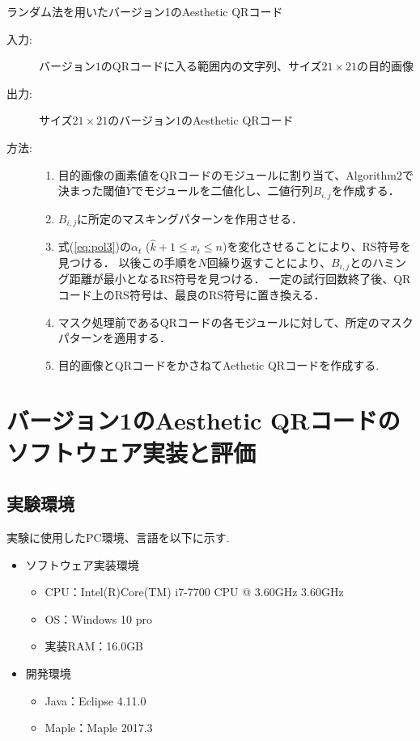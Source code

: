 \documentclass{thesis}
\begin{document}
\begin{algorithm}                      
\caption{ランダム法を用いたバージョン1のAesthetic QRコード}         
\label{alg:alg3} 
\begin{description}
\item[入力:] バージョン$1$のQRコードに入る範囲内の文字列、サイズ$21 \times 21$の目的画像
\item[出力:] サイズ$21 \times 21$のバージョン$1$のAesthetic QRコード
\item[方法:]
\begin{enumerate}
\item
目的画像の画素値をQRコードのモジュールに割り当て、Algorithm2で決まった閾値$\overline{Y}$でモジュールを二値化し、二値行列$B_{i,j}$を作成する．
\item
$B_{i,j}$に所定のマスキングパターンを作用させる．
\item
式(\ref{eq:pol3})の$\alpha_{t}$ ($\hat{k} + 1 \leq x_t \leq n $)を変化させることにより、RS符号を見つける．
以後この手順を$N$回繰り返すことにより、$B_{i,j}$とのハミング距離が最小となるRS符号を見つける．
一定の試行回数終了後、QRコード上のRS符号は、最良のRS符号に置き換える．
\item
マスク処理前であるQRコードの各モジュールに対して、所定のマスクパターンを適用する．
\item
目的画像とQRコードをかさねてAethetic QRコードを作成する.
\end{enumerate}
\end{description}
\end{algorithm} 



\chapter{バージョン1のAesthetic QRコードのソフトウェア実装と評価}
\label{chap:4}

\section{実験環境}

実験に使用したPC環境、言語を以下に示す.

\begin{itemize}
\setlength{\itemsep}{5mm}
 \item ソフトウェア実装環境
    \begin{itemize}
      \item CPU：Intel(R)Core(TM) i7-7700 CPU @ 3.60GHz 3.60GHz
      \item OS：Windows 10 pro
      \item 実装RAM：16.0GB
     \end{itemize}
   \item 開発環境
    \begin{itemize}
      \item Java：Eclipse 4.11.0
      \item Maple：Maple 2017.3
   \end{itemize}
\end{itemize}
\end{document}
